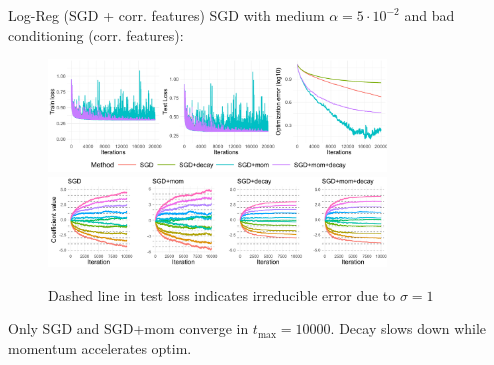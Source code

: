 \documentclass[11pt,compress,t,notes=noshow, xcolor=table]{beamer}
\begin{document}
\begin{vbframe}{Log-Reg (SGD + corr. features)}
\vspace{-0.4cm}
SGD with medium $\alpha=5\cdot10^{-2}$ and bad conditioning (corr. features):
\begin{figure}
            \includegraphics[width=0.8\textwidth]{slides/04-multivariate-first-order/figure_man/simu_linmod/SGD_log_med_lr_corr_iters.pdf} \\
             \includegraphics[width=0.8\textwidth]{slides/04-multivariate-first-order/figure_man/simu_linmod/SGD_log_coef_med_corr.pdf}\\
            \begin{footnotesize}
                Dashed line in test loss indicates irreducible error due to $\sigma=1$
            \end{footnotesize}
\end{figure}
Only SGD and SGD+mom converge in $t_{\text{max}}=10000$. Decay slows down while momentum accelerates optim.
\end{vbframe}
\end{document}
